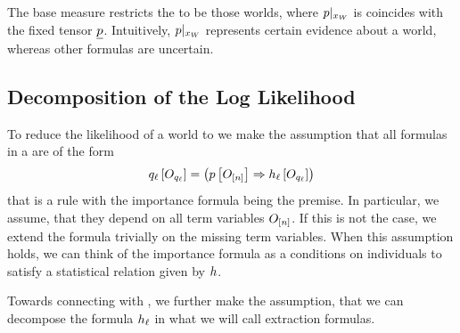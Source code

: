 The base measure restricts the \HybridFOLNetwork{} to be those worlds, where ${p}|_{x_{W}}$ is coincides with the fixed tensor $\underline{p}$.
Intuitively, ${p}|_{x_{W}}$ represents certain evidence about a \firstOrderLogic{} world, whereas other formulas are uncertain.




\subsection{Decomposition of the Log Likelihood}


To reduce the likelihood of a world to we make the assumption that all formulas in a \HybridFOLNetwork{} are of the form
\begin{align}
    \label{eq:folImplicationForm}
    q_{\ell}\left[O_{q_{\ell}}\right]
    = \left( p\left[O_{[n]}\right] \Rightarrow h_{\ell}\left[O_{q_{\ell}}\right] \right)
\end{align}
that is a rule with the importance formula being the premise.
In particular, we assume, that they depend on all term variables $O_{[n]}$.
If this is not the case, we extend the formula trivially on the missing term variables.
When this assumption holds, we can think of the importance formula as a conditions on individuals to satisfy a statistical relation given by $h$.

Towards connecting with \propositionalLogic{}, we further make the assumption, that we can decompose the formula $h_{\ell}$ in what we will call extraction formulas.

